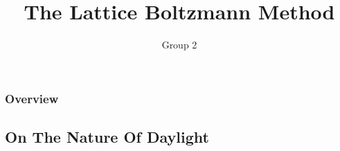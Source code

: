 \documentclass{beamer}
\title{The Lattice Boltzmann Method}
\author{Group 2}
\begin{document}
\maketitle
\begin{frame}
\frametitle{Overview}
\end{frame}
\begin{frame}
	\section{On The Nature Of Daylight}
\end{frame}
\end{document}
